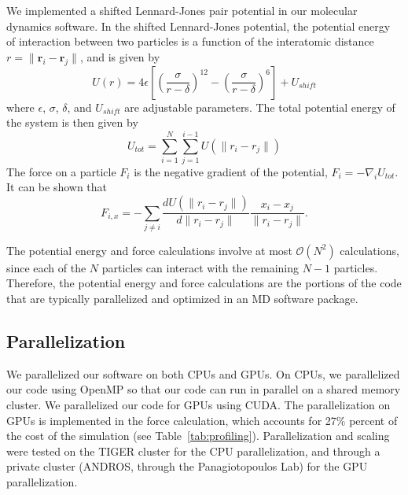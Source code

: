\documentclass[12pt]{article}
\begin{document}
We implemented a shifted Lennard-Jones pair potential in our molecular dynamics software.
%
In the shifted Lennard-Jones potential, the potential energy of interaction between two particles is a function of the interatomic distance $r = \|\mathbf{r}_i - \mathbf{r}_j \|$, and is given by
\begin{equation}
U(r) = 4 \epsilon\left[ \left( \frac{\sigma}{r-\delta} \right)^{12} - \left( \frac{\sigma}{r-\delta} \right)^6 \right] + U_{shift}
\end{equation}
where $\epsilon$, $\sigma$, $\delta$, and $U_{shift}$ are adjustable parameters.
%
The total potential energy of the system is then given by
\begin{equation}
U_{tot} = \sum_{i=1}^{N} \sum_{j=1}^{i-1} U\left( \| r_i - r_j \| \right)
\end{equation}
%
The force on a particle $F_i$ is the negative gradient of the potential, $F_i = -\nabla_i U_{tot}$.
%
It can be shown that
\begin{equation}
F_{i, x} = -\sum_{j \ne i} \frac{d U\left( \| r_i - r_j \| \right)}{d \| r_i - r_j \| } \frac{x_i - x_j}{\|r_i - r_j\|}.
\end{equation}

The potential energy and force calculations involve at most $\mathcal{O}(N^2)$ calculations, since each of the $N$ particles can interact with the remaining $N-1$ particles.
%
Therefore, the potential energy and force calculations are the portions of the code that are typically parallelized and optimized in an MD software package.

\subsection{Parallelization}

We parallelized our software on both CPUs and GPUs.
%
On CPUs, we parallelized our code using OpenMP so that our code can run in parallel on a shared memory cluster.
%
We parallelized our code for GPUs using CUDA.
%
The parallelization on GPUs is implemented in the force calculation, which accounts for 27\% percent of the cost of the simulation (see Table~\ref{tab:profiling}).
%
Parallelization and scaling were tested on the TIGER cluster for the CPU parallelization, and through a private cluster (ANDROS, through the Panagiotopoulos Lab) for the GPU parallelization.
\end{document}
